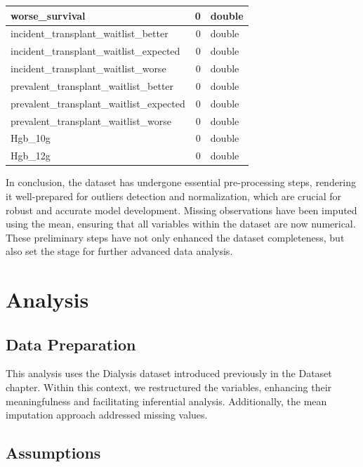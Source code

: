 \documentclass[
  letterpaper,
  DIV=11,
  numbers=noendperiod]{scrreprt}
\begin{document}
\begin{table}
\begin{tabular}[t]{l|r|l}
\hline
worse\_survival & 0 & double\\
\hline
incident\_transplant\_waitlist\_better & 0 & double\\
\hline
incident\_transplant\_waitlist\_expected & 0 & double\\
\hline
incident\_transplant\_waitlist\_worse & 0 & double\\
\hline
prevalent\_transplant\_waitlist\_better & 0 & double\\
\hline
prevalent\_transplant\_waitlist\_expected & 0 & double\\
\hline
prevalent\_transplant\_waitlist\_worse & 0 & double\\
\hline
Hgb\_10g & 0 & double\\
\hline
Hgb\_12g & 0 & double\\
\hline
\end{tabular}
\end{table}

In conclusion, the dataset has undergone essential pre-processing steps,
rendering it well-prepared for outliers detection and normalization,
which are crucial for robust and accurate model development. Missing
observations have been imputed using the mean, ensuring that all
variables within the dataset are now numerical. These preliminary steps
have not only enhanced the dataset completeness, but also set the stage
for further advanced data analysis.


\hypertarget{analysis}{%
\chapter{Analysis}\label{analysis}}

\hypertarget{data-preparation-1}{%
\section{Data Preparation}\label{data-preparation-1}}

This analysis uses the Dialysis dataset introduced previously in the
Dataset chapter. Within this context, we restructured the variables,
enhancing their meaningfulness and facilitating inferential analysis.
Additionally, the mean imputation approach addressed missing values.

\hypertarget{assumptions-1}{%
\section{Assumptions}\label{assumptions-1}}
\end{document}
